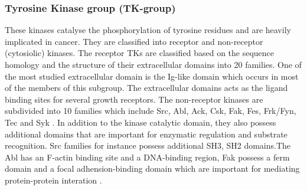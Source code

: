 \documentclass[a4paper, 11pt]{article}
\begin{document}
\subsubsection*{Tyrosine Kinase group (TK-group)}
These kinases catalyse the phosphorylation of tyrosine residues and are heavily implicated in cancer. They are classified into receptor and non-receptor (cytosiolic) kinases. The receptor TKs are classified based on the sequence homology and the structure of their extracellular domains into 20 families. One of the most studied extracellular domain is the Ig-like domain which occurs in most of the members of this subgroup. The extracellular domains acts as the ligand binding sites for several growth receptors. The non-receptor kinases are subdivided into 10 families which include Src, Abl, Ack, Csk, Fak, Fes, Frk/Fyn, Tec and Syk \cite{rakshambikai2015typical}. In addition to the kinase catalytic domain, they also possess additional domains that are important for enzymatic regulation and substrate recognition. Src families for instance possess additional SH3, SH2 domains.The Abl has an F-actin binding site and a DNA-binding region, Fak possess a ferm domain and a focal adhension-binding domain which are important for mediating protein-protein interation \cite{duong2013human,rakshambikai2015typical}.\\
\end{document}
